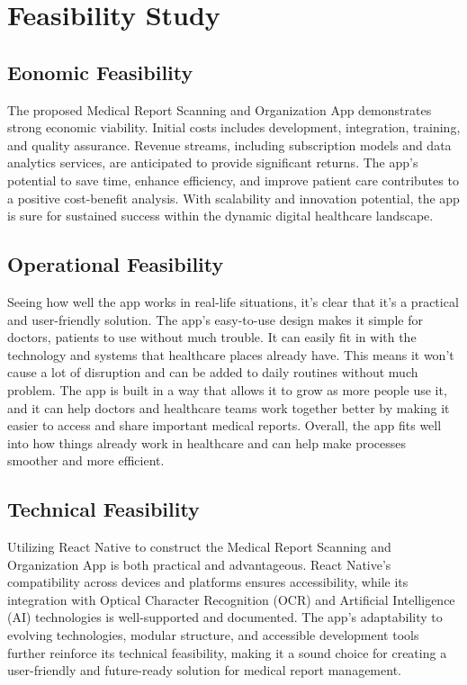\section{Feasibility Study}
\subsection{Eonomic Feasibility}
The proposed Medical Report Scanning and Organization App demonstrates strong economic viability. Initial costs includes development, integration, training, and quality assurance. Revenue streams, including subscription models and data analytics services, are anticipated to provide significant returns. The app's potential to save time, enhance efficiency, and improve patient care contributes to a positive cost-benefit analysis. With scalability and innovation potential, the app is sure for sustained success within the dynamic digital healthcare landscape.
\subsection{Operational Feasibility}
 Seeing how well the app works in real-life situations, it's clear that it's a practical and user-friendly solution. The app's easy-to-use design makes it simple for doctors, patients to use without much trouble. It can easily fit in with the technology and systems that healthcare places already have. This means it won't cause a lot of disruption and can be added to daily routines without much problem. The app is built in a way that allows it to grow as more people use it, and it can help doctors and healthcare teams work together better by making it easier to access and share important medical reports. Overall, the app fits well into how things already work in healthcare and can help make processes smoother and more efficient.
 \subsection{Technical Feasibility}
Utilizing React Native to construct the Medical Report Scanning and Organization App is both practical and advantageous. React Native's compatibility across devices and platforms ensures accessibility, while its integration with Optical Character Recognition (OCR) and Artificial Intelligence (AI) technologies is well-supported and documented. The app's adaptability to evolving technologies, modular structure, and accessible development tools further reinforce its technical feasibility, making it a sound choice for creating a user-friendly and future-ready solution for medical report management.